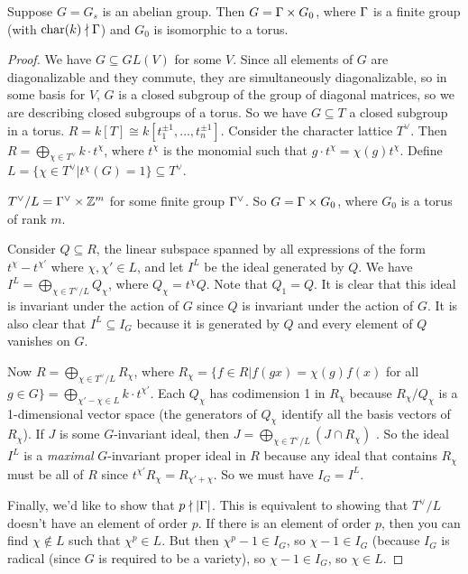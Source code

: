\begin{proposition}
 Suppose $G=G_s$ is an abelian group. Then $G=\Gamma\times G_0$, where $\Gamma$ is a finite group (with $\mathrm{char}(k)\nmid \Gamma$) and $G_0$ is isomorphic to a torus.
\end{proposition}
\begin{proof}
 We have $G\subseteq GL(V)$ for some $V$. Since all elements of $G$ are diagonalizable and they commute, they are simultaneously diagonalizable, so in some basis for $V$, $G$ is a closed subgroup of the group of diagonal matrices, so we are describing closed subgroups of a torus. So we have $G\subseteq T$ a closed subgroup in a torus. $R=k[T]\cong k[t_1^{\pm 1},\dots, t_n^{\pm 1}]$. Consider the character lattice $T^\vee$. Then $R=\bigoplus_{\chi\in T^\vee} k\cdot t^\chi$, where $t^\chi$ is the monomial such that $g\cdot t^\chi=\chi(g)t^\chi$. Define $L=\{\chi\in T^\vee| t^\chi(G)=1\}\subseteq T^\vee$.
 
 $T^\vee/L=\Gamma^\vee\times \mathbb{Z}^m$ for some finite group $\Gamma^\vee$. So $G=\Gamma\times G_0$, where $G_0$ is a torus of rank $m$. 
 
  Consider $Q\subseteq R$, the linear subspace spanned by all expressions of the form $t^\chi-t^{\chi'}$ where $\chi,\chi'\in L$, and let $I^L$ be the ideal generated by $Q$. We have $I^L=\bigoplus_{\chi\in T^\vee/L}Q_\chi$, where $Q_\chi=t^\chi Q$. Note that $Q_1=Q$. It is clear that this ideal is invariant under the action of $G$ since $Q$ is invariant under the action of $G$. It is also clear that $I^L\subseteq I_G$ because it is generated by $Q$ and every element of $Q$ vanishes on $G$.
 
 Now $R=\bigoplus_{\chi\in T^\vee/L} R_\chi$, where $R_\chi=\{f\in R|f(gx)=\chi(g)f(x)$ for all $g\in G\}=\bigoplus_{\chi'-\chi\in L} k\cdot t^{\chi'}$. Each $Q_\chi$ has codimension 1 in $R_\chi$ because $R_\chi/Q_\chi$ is a 1-dimensional vector space (the generators of $Q_\chi$ identify all the basis vectors of $R_\chi$). If $J$ is some $G$-invariant ideal, then $J=\bigoplus_{\chi\in T^\vee/L} (J\cap R_\chi)$ . So the ideal $I^L$ is a \emph{maximal} $G$-invariant proper ideal in $R$ because any ideal that contains $R_\chi$ must be all of $R$ since $t^{\chi'}R_\chi=R_{\chi'+\chi}$. So we must have $I_G=I^L$.
 
 Finally, we'd like to show that $p\nmid |\Gamma|$. This is equivalent to showing that $T^\vee/L$ doesn't have an element of order $p$. If there is an element of order $p$, then you can find $\chi\not\in L$ such that $\chi^p\in L$. But then $\chi^p-1\in I_G$, so $\chi-1\in I_G$ (because $I_G$ is radical (since $G$ is required to be a variety), so $\chi-1\in I_G$, so $\chi\in L$. 
\end{proof}
